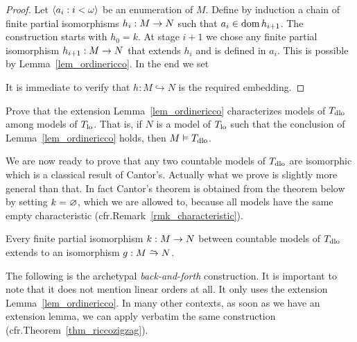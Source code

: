\documentclass[creche.tex]{subfiles}
\begin{document}
\begin{proof}
Let $\<a_i:i<\omega\>$ be an enumeration of $M$. Define by induction a chain of finite partial isomorphisms $h_i:M\imp N$ such that $a_i\in\dom h_{i+1}$. The construction starts with $h_0=k$. At stage $i+1$ we chose any finite partial isomorphism $h_{i+1}:M\imp N$ that extends $h_i$ and is defined in $a_i$. This is possible by Lemma~\ref{lem_ordinericco}. In the end we set


It is immediate to verify that $h:M\hookrightarrow N$ is the required embedding.
\end{proof}


\begin{exercise}\label{ex_ricco->dlo}
Prove that the extension Lemma~\ref{lem_ordinericco} characterizes models of $T_{\rm dlo}$ among models of $T_{\rm lo}$. That is, if $N$ is a model of $T_{\rm lo}$ such that the conclusion of Lemma~\ref{lem_ordinericco} holds, then $M\models  T_{\rm dlo}$.\QED
\end{exercise}


We are now ready to prove that any two countable models of $T_{\rm dlo}$ are isomorphic which is a classical result of Cantor's. Actually what we prove is slightly more general than that. In fact Cantor's theorem is obtained from the theorem below by setting $k=\0$, which we are allowed to, because all models have the same empty characteristic (cfr.\@ Remark~\ref{rmk_characteristic}).

\begin{theorem}\label{thm_zigzagcantor}
Every finite partial isomorphism $k:M\imp N$ between countable models of $T_{\rm dlo}$ extends to an isomorphism $g:M\isomap N$.
\end{theorem}

The following is the archetypal \emph{back-and-forth\/} construction. It is important to note that it does not mention linear orders at all. It only uses the extension Lemma~\ref{lem_ordinericco}. In many other contexts, as soon as we have an extension lemma, we can apply verbatim the same construction (cfr.\@ Theorem~\ref{thm_riccozigzag}).
\end{document}
